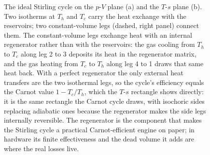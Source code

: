 \begin{figure}[htbp]
\caption[The ideal Stirling cycle]{The ideal Stirling cycle on the $p$-$V$
plane (a) and the $T$-$s$ plane (b). Two isotherms at $T_h$ and $T_c$ carry the
heat exchange with the reservoirs; two constant-volume legs (dashed, right
panel) connect them. The constant-volume legs exchange heat with an internal
regenerator rather than with the reservoirs: the gas cooling from $T_h$ to
$T_c$ along leg 2 to 3 deposits its heat in the regenerator matrix, and the gas
heating from $T_c$ to $T_h$ along leg 4 to 1 draws that same heat back. With a
perfect regenerator the only external heat transfers are the two isothermal
legs, so the cycle's efficiency equals the Carnot value $1 - T_c/T_h$, which
the $T$-$s$ rectangle shows directly: it is the same rectangle the Carnot cycle
draws, with isochoric sides replacing adiabatic ones because the regenerator
makes the side legs internally reversible. The regenerator is the component
that makes the Stirling cycle a practical Carnot-efficient engine on paper; in
hardware its finite effectiveness and the dead volume it adds are where the
real losses live.}
\label{fig:vol04ch03:stirling-pv-ts}
\end{figure}
